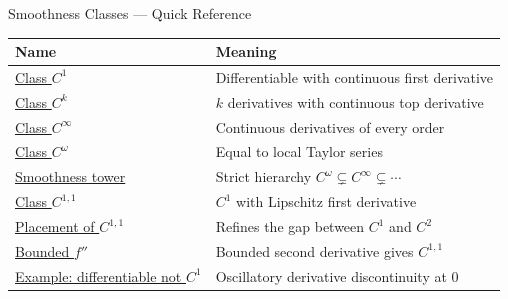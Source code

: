 \begin{toolkitbox}{Smoothness Classes --- Quick Reference}
\small
\begin{tabular}{l l}
\toprule
\textbf{Name} & \textbf{Meaning} \\
\midrule
\hyperref[def:class-c1]{Class \(C^1\)} & Differentiable with continuous first derivative \\
\hyperref[def:class-ck]{Class \(C^k\)} & \(k\) derivatives with continuous top derivative \\
\hyperref[def:class-cinfty]{Class \(C^\infty\)} & Continuous derivatives of every order \\
\hyperref[def:class-comega]{Class \(C^\omega\)} & Equal to local Taylor series \\
\hyperref[thm:smoothness-tower]{Smoothness tower} & Strict hierarchy \(C^\omega\subsetneq C^\infty\subsetneq\cdots\) \\
\hyperref[def:class-c11]{Class \(C^{1,1}\)} & \(C^1\) with Lipschitz first derivative \\
\hyperref[thm:c11-placement]{Placement of \(C^{1,1}\)} & Refines the gap between \(C^1\) and \(C^2\) \\
\hyperref[cor:bounded-second-derivative-implies-c11]{Bounded \(f''\)} & Bounded second derivative gives \(C^{1,1}\) \\
\hyperref[ex:x2sin]{Example: differentiable not \(C^1\)} & Oscillatory derivative discontinuity at \(0\) \\
\bottomrule
\end{tabular}
\end{toolkitbox}


